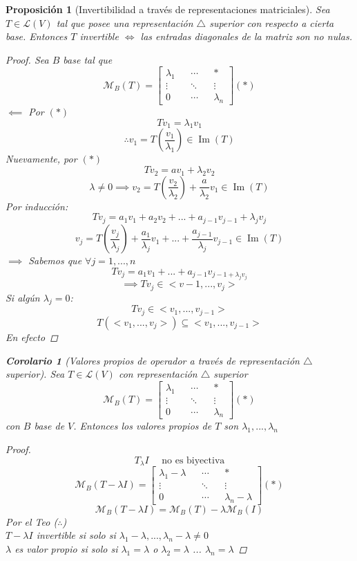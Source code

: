 \documentclass[11pt]{book}
\DeclareMathOperator{\Ima}{Im}
\newtheorem{prop}[thm]{Proposición}
\newtheorem*{cor}{Corolario}
\theoremstyle{definition}
\begin{document}
\begin{prop}[Invertibilidad a través de representaciones matriciales]
	Sea $T\in\mathcal{L}(V)$ tal que posee una representación $\triangle$ superior con respecto a cierta base. Entonces $T$ invertible $\iff$ las entradas diagonales de la matriz son no nulas.
	\begin{proof}
		Sea $B$ base tal que
		\[\mathcal{M}_B(T)=\begin{bmatrix}
			\lambda_1 && \cdots && *\\
			\vdots && \ddots && \vdots\\
			0 && \cdots && \lambda_n
		\end{bmatrix}(*)\]
		$\impliedby$ Por $(*)$
		\[Tv_1=\lambda_1v_1\]
		\[\therefore v_1=T\left(\frac{v_1}{\lambda_1}\right)\in \Ima(T)\]
		Nuevamente, por $(*)$
		\[Tv_2=av_1+\lambda_2v_2\]
		\[\lambda\neq 0\implies v_2=T\left(\frac{v_2}{\lambda_2}\right)+\frac{a}{\lambda_2}v_1\in\Ima(T)\]
		Por inducción:
		\[Tv_j=a_1v_1+a_2v_2+...+a_{j-1}v_{j-1}+\lambda_jv_j\]
		\[v_j=T\left(\frac{v_j}{\lambda_j}\right)+\frac{a_1}{\lambda_j}v_1+...+\frac{a_{j-1}}{\lambda_j}v_{j-1}\in\Ima(T)\]
		$\implies$ Sabemos que $\forall j=1,...,n$
		\[Tv_j=a_1v_1+...+a_{j-1}v_{j-1+\lambda_jv_j}\]
		\[\implies Tv_j\in<v-1,...,v_j>\]
		Si algún $\lambda_j=0$:
		\[Tv_j\in<v_1,...,v_{j-1}>\]
		\[T(<v_1,...,v_j>)\subseteq <v_1,...,v_{j-1}>\]
		En efecto
	\end{proof}
	\begin{cor}[Valores propios de operador a través de representación $\triangle$ superior]
		Sea $T\in\mathcal{L}(V)$ con representación $\triangle$ superior
		\[\mathcal{M}_B(T)=\begin{bmatrix}
			\lambda_1 && \cdots && *\\
			\vdots && \ddots && \vdots\\
			0 && \cdots && \lambda_n
		\end{bmatrix}(*)\]
		con $B$ base de $V$. Entonces los valores propios de $T$ son $\lambda_1,...,\lambda_n$
		\begin{proof}
			\[T_\lambda I\quad\textrm{ no es biyectiva}\]
			\[\mathcal{M}_B(T-\lambda I)=\begin{bmatrix}
				\lambda_1-\lambda && \cdots && *\\
				\vdots && \ddots && \vdots\\
				0 && \cdots && \lambda_n-\lambda
			\end{bmatrix}(*)\]
			\[\mathcal{M}_B(T-\lambda I)=\mathcal{M}_B(T)-\lambda\mathcal{M}_B(I)\]
			Por el Teo ($\therefore$)\\
			$T-\lambda I$ invertible si solo si $\lambda_1-\lambda,...,\lambda_n-\lambda\neq 0$\\
			$\lambda$ es valor propio si solo si $\lambda_1=\lambda$ o $\lambda_2=\lambda$ ... $\lambda_n=\lambda$
		\end{proof}
	\end{cor}
\end{prop}
\end{document}
